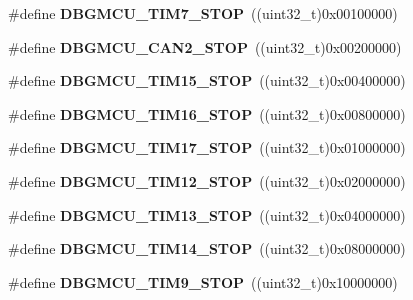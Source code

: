 \begin{DoxyCompactItemize}
\item 
\hypertarget{group__DBGMCU__Exported__Constants_gaf593ca16ee6d3f1fabc549878f3f87f0}{
\#define {\bfseries DBGMCU\_\-TIM7\_\-STOP}~((uint32\_\-t)0x00100000)}
\label{group__DBGMCU__Exported__Constants_gaf593ca16ee6d3f1fabc549878f3f87f0}

\item 
\hypertarget{group__DBGMCU__Exported__Constants_gace53677f1b7b9a52b592cf2b0f3f7178}{
\#define {\bfseries DBGMCU\_\-CAN2\_\-STOP}~((uint32\_\-t)0x00200000)}
\label{group__DBGMCU__Exported__Constants_gace53677f1b7b9a52b592cf2b0f3f7178}

\item 
\hypertarget{group__DBGMCU__Exported__Constants_ga68f2b4e7feb0a1f1e4b437a104c30f03}{
\#define {\bfseries DBGMCU\_\-TIM15\_\-STOP}~((uint32\_\-t)0x00400000)}
\label{group__DBGMCU__Exported__Constants_ga68f2b4e7feb0a1f1e4b437a104c30f03}

\item 
\hypertarget{group__DBGMCU__Exported__Constants_ga8a0698403a9c76115bc607ee0149193f}{
\#define {\bfseries DBGMCU\_\-TIM16\_\-STOP}~((uint32\_\-t)0x00800000)}
\label{group__DBGMCU__Exported__Constants_ga8a0698403a9c76115bc607ee0149193f}

\item 
\hypertarget{group__DBGMCU__Exported__Constants_gabf3a93a60431c892bdf36ff02081badc}{
\#define {\bfseries DBGMCU\_\-TIM17\_\-STOP}~((uint32\_\-t)0x01000000)}
\label{group__DBGMCU__Exported__Constants_gabf3a93a60431c892bdf36ff02081badc}

\item 
\hypertarget{group__DBGMCU__Exported__Constants_ga4814287cef24f57e795b0f5b0174b49c}{
\#define {\bfseries DBGMCU\_\-TIM12\_\-STOP}~((uint32\_\-t)0x02000000)}
\label{group__DBGMCU__Exported__Constants_ga4814287cef24f57e795b0f5b0174b49c}

\item 
\hypertarget{group__DBGMCU__Exported__Constants_gae0dd8a28977b261b013fa1ecda79b289}{
\#define {\bfseries DBGMCU\_\-TIM13\_\-STOP}~((uint32\_\-t)0x04000000)}
\label{group__DBGMCU__Exported__Constants_gae0dd8a28977b261b013fa1ecda79b289}

\item 
\hypertarget{group__DBGMCU__Exported__Constants_ga731f63d66045abee68dbc634070df051}{
\#define {\bfseries DBGMCU\_\-TIM14\_\-STOP}~((uint32\_\-t)0x08000000)}
\label{group__DBGMCU__Exported__Constants_ga731f63d66045abee68dbc634070df051}

\item 
\hypertarget{group__DBGMCU__Exported__Constants_ga560c557a0d0839dba04f7f2b47851109}{
\#define {\bfseries DBGMCU\_\-TIM9\_\-STOP}~((uint32\_\-t)0x10000000)}
\label{group__DBGMCU__Exported__Constants_ga560c557a0d0839dba04f7f2b47851109}


\end{DoxyCompactItemize}

